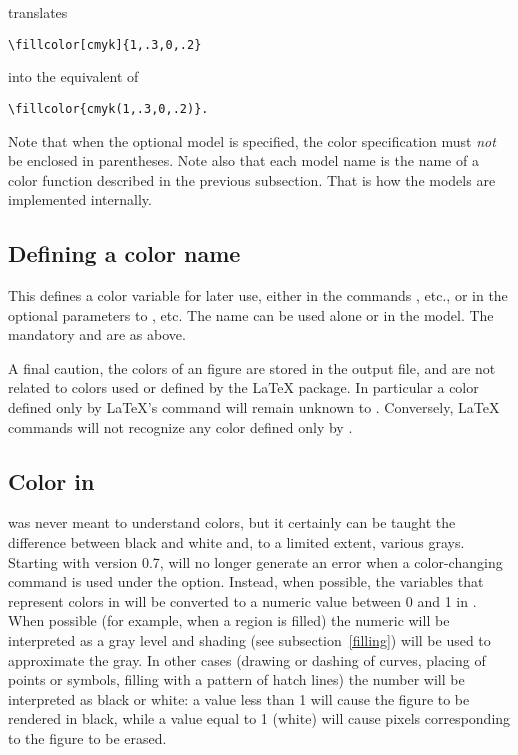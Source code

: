 \documentclass[letterpaper]{article}
\begin{document}
\medskip
\Mfp{} translates
\begin{verbatim}
\fillcolor[cmyk]{1,.3,0,.2}
\end{verbatim}
into the equivalent of
\begin{verbatim}
\fillcolor{cmyk(1,.3,0,.2)}.
\end{verbatim}
Note that when the optional model is specified, the color
specification must \emph{not} be enclosed in parentheses. Note also that each
model name is the name of a color function described in the previous
subsection. That is how the models are implemented internally.


\subsection{Defining a color name}\label{colorname}

\begin{cd}
%
\end{cd}

This defines a color variable  for later use, either in the
commands , etc., or in the optional parameters to
, etc. The name can be used alone or in the  model.
The mandatory  and  are as above.

\medskip
A final caution, the colors of an \mfp{} figure are stored in the
 output file, and are not related to colors used or defined by
the \LaTeX{}  package. In particular a color defined only by
\LaTeX{}'s  command will remain unknown to \mfp{}.
Conversely, \LaTeX{} commands will not recognize any color defined only
by .

\subsection{Color in \MF{}}\label{MFcolor}

\CMF{} was never meant to understand colors, but it certainly can be
taught the difference between black and white and, to a limited extent,
various grays. Starting with version 0.7, \mfp{} will no longer generate
an error when a color-changing command is used under the 
option. Instead, when possible, the variables that represent colors in
\MP{} will be converted to a numeric value between 0 and 1 in \MF{}. When
possible (for example, when a region is filled) the numeric will be
interpreted as a gray level and shading (see subsection~\ref{filling})
will be used to approximate the gray. In other cases (drawing or dashing
of curves, placing of points or symbols, filling with a pattern of hatch
lines) the number will be interpreted as black or white: a value less
than 1 will cause the figure to be rendered in black, while a value
equal to 1 (white) will cause pixels corresponding to the figure to be
erased.
\end{document}
